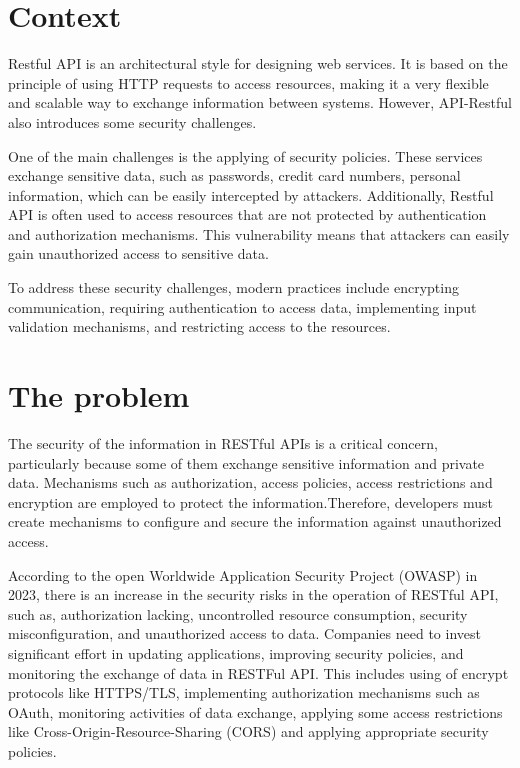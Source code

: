 \section{Context}

Restful API is an architectural style for designing web services. It is based on the principle of using HTTP requests to access resources, making it a very flexible and scalable way to exchange information between systems. However, API-Restful also introduces some security challenges.

One of the main challenges is the applying of security policies. These services exchange sensitive data, such as passwords, credit card numbers, personal information, which can be easily intercepted by attackers. Additionally, Restful API is often used to access resources that are not protected by authentication and authorization mechanisms. This vulnerability means that attackers can easily gain unauthorized access to sensitive data.

To address these security challenges, modern practices include encrypting communication, requiring authentication to access data, implementing input validation mechanisms, and restricting access to the resources.

\section{The problem}

The security of the information in RESTful APIs is a critical concern, particularly because some of them exchange sensitive information and private data. Mechanisms such as authorization, access policies, access restrictions and encryption are employed to protect the information.Therefore, developers must create mechanisms to configure and secure the information against unauthorized access.

According to the open Worldwide Application Security Project (OWASP) in 2023, there is an increase in the security risks in the operation of RESTful API, such as, authorization lacking, uncontrolled resource consumption, security misconfiguration, and unauthorized access to data. Companies need to invest significant effort in updating applications, improving security policies, and monitoring the exchange of data in RESTFul API. This includes using of encrypt protocols like HTTPS/TLS, implementing authorization mechanisms such as OAuth, monitoring activities of data exchange, applying some access restrictions like Cross-Origin-Resource-Sharing (CORS) and applying appropriate security policies\cite{Riggs2023}.

